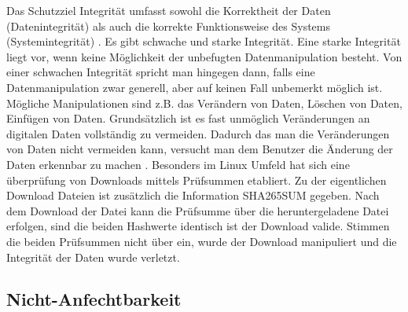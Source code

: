 \documentclass[utf8,biblatex]{lni}
\begin{document}
Das Schutzziel Integrität umfasst sowohl die Korrektheit der Daten (Datenintegrität) 
als auch die korrekte Funktionsweise des Systems (Systemintegrität) \cite{Kriha.2008}. 
Es gibt schwache und starke Integrität. 
Eine starke Integrität liegt vor, wenn keine Möglichkeit der unbefugten Datenmanipulation besteht. 
Von einer schwachen Integrität spricht man hingegen dann, falls eine Datenmanipulation zwar generell, 
aber auf keinen Fall unbemerkt möglich ist. 
Mögliche Manipulationen sind z.B. das
Verändern von Daten,
Löschen von Daten,
Einfügen von Daten.
Grundsätzlich ist es fast unmöglich Veränderungen an digitalen Daten vollständig zu vermeiden. 
Dadurch das man die Veränderungen von Daten nicht vermeiden kann, versucht man dem Benutzer die 
Änderung der Daten erkennbar zu machen \cite{Kriha.2008}. 
Besonders im Linux Umfeld hat sich eine überprüfung von Downloads mittels Prüfsummen etabliert.
Zu der eigentlichen Download Dateien ist zusätzlich die Information \glqq SHA265SUM\grqq{ } gegeben.
Nach dem Download der Datei kann die Prüfsumme über die heruntergeladene Datei erfolgen,
sind die beiden Hashwerte identisch ist der Download valide. 
Stimmen die beiden Prüfsummen nicht über ein, wurde der Download manipuliert und die 
Integrität der Daten wurde verletzt.

\subsection{Nicht-Anfechtbarkeit}
\end{document}
